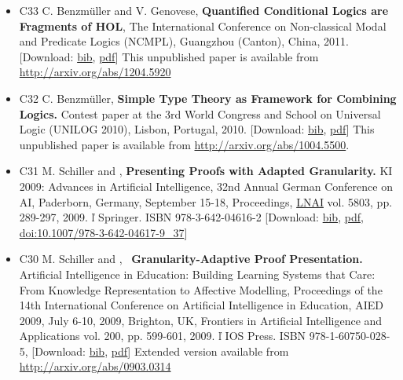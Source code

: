 \documentclass{article}
\newcommand{\tmstrong}[1]{\textbf{#1}}
\newcommand{\tmtextbf}[1]{{\bfseries{#1}}}
\newcommand{\tmtextit}[1]{{\itshape{#1}}}
\newcommand{\tmtextmd}[1]{{\mdseries{#1}}}
\newcommand{\tmtextup}[1]{{\upshape{#1}}}
\newenvironment{itemizedot}{\begin{itemize} \renewcommand{\labelitemi}{$\bullet$}\renewcommand{\labelitemii}{$\bullet$}\renewcommand{\labelitemiii}{$\bullet$}\renewcommand{\labelitemiv}{$\bullet$}}{\end{itemize}}
\begin{document}
\begin{itemizedot}
  \item [C33] C. Benzm\"uller and V. Genovese, {\tmstrong{Quantified
  Conditional Logics are Fragments of HOL}}, The International Conference on
  Non-classical Modal and Predicate Logics (NCMPL), Guangzhou (Canton), China,
  2011. \ {\color{grey} [Download: {\small \href{../papers/C33.bib}{bib}},
  {\small \href{../papers/C33.pdf}{pdf}}]} This unpublished paper is available
  from \href{http://arxiv.org/abs/1204.5920}{http://arxiv.org/abs/1204.5920}
  
  \item [C32] C. Benzm\"uller, {\tmstrong{Simple Type Theory as Framework for
  Combining Logics.}} Contest paper at the 3rd {\tmstrong{}}World Congress and
  School on Universal Logic (UNILOG 2010), Lisbon, Portugal, 2010.
  {\color{grey} [Download: {\small \href{../papers/C32.bib}{bib}}, {\small
  \href{../papers/C32.pdf}{pdf}}]} This unpublished paper is
  a{\tmstrong{}}vailable from
  \href{http://arxiv.org/abs/1004.5500}{http://arxiv.org/abs/1004.5500}.{\tmstrong{}}
  
  \item [C31] M. Schiller and {\small \tmtextit{\tmtextmd{\tmtextup{C.
  Benzm\"uller}}},} {\small \tmtextbf{Presenting Proofs with Adapted
  Granularity.}} KI 2009: Advances in Artificial Intelligence, 32nd Annual
  German Conference on AI, Paderborn, Germany, September 15-18, Proceedings,
  \href{http://www.springer.de/comp/lncs/}{LNAI} vol. 5803, pp. 289-297, 2009.
  \v{l}  Springer. ISBN 978-3-642-04616-2 {\color{grey} [Download: {\small
  \href{../papers/C31.bib}{bib}}, {\small \href{../papers/C31.pdf}{pdf}},
  {\small
  \href{10.1007/978-3-642-04617-9\_37}{doi:10.1007/978-3-642-04617-9\_37}}]}
  
  \item [C30] M. Schiller and {\small \tmtextit{\tmtextmd{\tmtextup{C.
  Benzm\"uller}}},} \ {\small \tmtextbf{Granularity-Adaptive Proof
  Presentation.}} Artificial Intelligence in Education: Building Learning
  Systems that Care: From Knowledge Representation to Affective Modelling,
  Proceedings of the 14th International Conference on Artificial Intelligence
  in Education, AIED 2009, July 6-10, 2009, Brighton, UK, Frontiers in
  Artificial Intelligence and Applications vol. 200, pp. 599-601, 2009.  \v{l}
  IOS Press. ISBN 978-1-60750-028-5, {\color{grey} [Download: {\small
  \href{../papers/C30.bib}{bib}}, {\small \href{../papers/C30.pdf}{pdf}}]}
  Extended version available from
  \href{http://arxiv.org/abs/0903.0314}{http://arxiv.org/abs/0903.0314}
  

\end{itemizedot}
\end{document}
